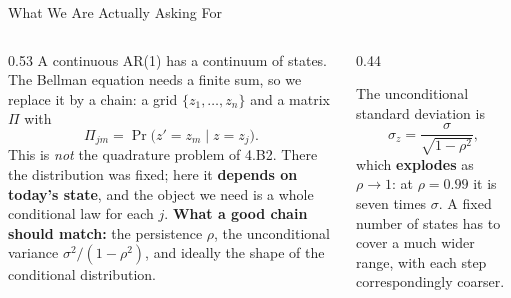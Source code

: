 \begin{frame}{What We Are Actually Asking For}
\begin{columns}[T]
\begin{column}{0.53\textwidth}
\small
A continuous AR(1) has a continuum of states. The Bellman equation needs a finite sum, so we replace it by a chain: a grid $\{z_1,\dots,z_n\}$ and a matrix $\Pi$ with
\[
  \Pi_{jm}=\Pr\big(z'=z_m \mid z=z_j\big).
\]
\medskip
This is \emph{not} the quadrature problem of 4.B2. There the distribution was fixed; here it \textbf{depends on today's state}, and the object we need is a whole conditional law for each $j$.
\medskip
\textbf{What a good chain should match:} the persistence $\rho$, the unconditional variance $\sigma^{2}/(1-\rho^{2})$, and ideally the shape of the conditional distribution.
\end{column}
\begin{column}{0.44\textwidth}
\begin{conceptbox}[title=\textbf{Why $\rho$ near one is hard}]\small
The unconditional standard deviation is
\[
  \sigma_z=\frac{\sigma}{\sqrt{1-\rho^{2}}},
\]
which \textbf{explodes} as $\rho\to1$: at $\rho=0.99$ it is seven times $\sigma$. A fixed number of states has to cover a much wider range, with each step correspondingly coarser.
\end{conceptbox}
\end{column}
\end{columns}
\vspace{1mm}
\end{frame}

